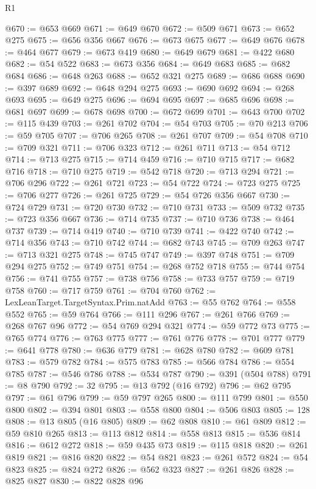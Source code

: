 \begin{lexlean}{R1}
\begin{coremodule}
@670 := @653 @669
@671 := @649 @670
@672 := @509 @671
@673 := @652 @275
@675 := @656 @356 @667
@676 := @673 @675
@677 := @649 @676
@678 := @464 @677
@679 := @673 @419
@680 := @649 @679
@681 := @422 @680
@682 := @54 @522
@683 := @673 @356
@684 := @649 @683
@685 := @682 @684
@686 := @648 @263
@688 := @652 @321 @275
@689 := @686 @688
@690 := @397 @689
@692 := @648 @294 @275
@693 := @690 @692
@694 := @268 @693
@695 := @649 @275
@696 := @694 @695
@697 := @685 @696
@698 := @681 @697
@699 := @678 @698
@700 := @672 @699
@701 := @643 @700
@702 := @115 @439
@703 := @261 @702
@704 := @54 @703
@705 := @70 @213
@706 := @59 @705
@707 := @706 @265
@708 := @261 @707
@709 := @54 @708
@710 := @709 @321
@711 := @706 @323
@712 := @261 @711
@713 := @54 @712
@714 := @713 @275
@715 := @714 @459
@716 := @710 @715
@717 := @682 @716
@718 := @710 @275
@719 := @542 @718
@720 := @713 @294
@721 := @706 @296
@722 := @261 @721
@723 := @54 @722
@724 := @723 @275
@725 := @706 @277
@726 := @261 @725
@729 := @54 @726 @356 @667
@730 := @724 @729
@731 := @720 @730
@732 := @710 @731
@733 := @509 @732
@735 := @723 @356 @667
@736 := @714 @735
@737 := @710 @736
@738 := @464 @737
@739 := @714 @419
@740 := @710 @739
@741 := @422 @740
@742 := @714 @356
@743 := @710 @742
@744 := @682 @743
@745 := @709 @263
@747 := @713 @321 @275
@748 := @745 @747
@749 := @397 @748
@751 := @709 @294 @275
@752 := @749 @751
@754 := @268 @752 @718
@755 := @744 @754
@756 := @741 @755
@757 := @738 @756
@758 := @733 @757
@759 := @719 @758
@760 := @717 @759
@761 := @704 @760
@762 := LexLeanTarget.TargetSyntax.Prim.natAdd
@763 := @55 @762
@764 := @558 @552
@765 := @59 @764
@766 := @111 @296
@767 := @261 @766
@769 := @268 @767 @96
@772 := @54 @769 @294 @321
@774 := @59 @772 @73
@775 := @765 @774
@776 := @763 @775
@777 := @761 @776
@778 := @701 @777
@779 := @641 @778
@780 := @636 @779
@781 := @628 @780
@782 := @609 @781
@783 := @579 @782
@784 := @575 @783
@785 := @566 @784
@786 := @554 @785
@787 := @546 @786
@788 := @534 @787
@790 := @391 (@504 @788)
@791 := @8 @790
@792 := 32
@795 := @13 @792 (@16 @792)
@796 := @62 @795
@797 := @61 @796
@799 := @59 @797 @265
@800 := @111 @799
@801 := @550 @800
@802 := @394 @801
@803 := @558 @800
@804 := @506 @803
@805 := 128
@808 := @13 @805 (@16 @805)
@809 := @62 @808
@810 := @61 @809
@812 := @59 @810 @265
@813 := @113 @812
@814 := @558 @813
@815 := @536 @814
@816 := @612 @272
@818 := @59 @435 @73
@819 := @115 @818
@820 := @261 @819
@821 := @816 @820
@822 := @54 @821
@823 := @261 @572
@824 := @54 @823
@825 := @824 @272
@826 := @562 @323
@827 := @261 @826
@828 := @825 @827
@830 := @822 @828 @96

\end{coremodule}
\end{lexlean}

